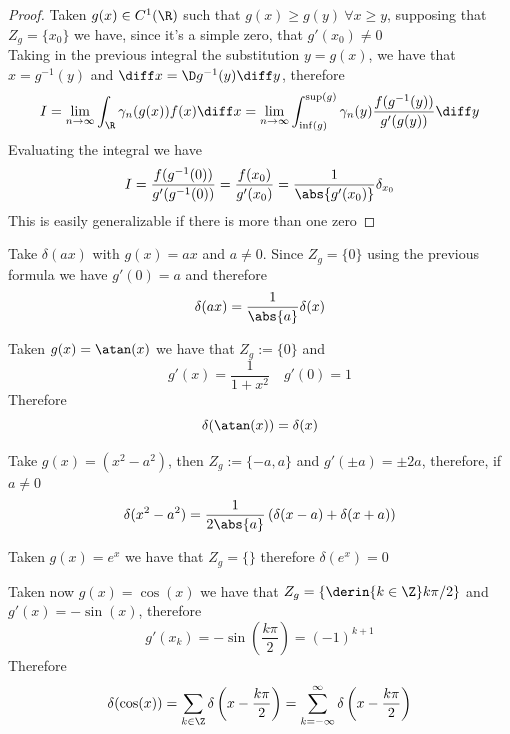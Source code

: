 \documentclass[../mmf.tex]{subfiles}
\begin{document}
\begin{proof}
	Taken $g(x)\in C^1(\R)$ such that $g(x)\ge g(y)\ \forall x\ge y$, supposing that $Z_g=\{x_0\}$ we have, since it's a simple zero, that $g'(x_0)\ne0$\\
	Taking in the previous integral the substitution $y=g(x)$, we have that $x=g^{-1}(y)$ and $\diff x=\D g^{-1}(y)\diff y$, therefore
	\begin{equation*}
		I=\lim_{n\to\infty}\int_{\R}^{}\gamma_n(g(x))f(x)\diff x=\lim_{n\to\infty}\int_{\inf(g)}^{\sup(g)}\gamma_n(y)\frac{f(g^{-1}(y))}{g'(g(y))}\diff y
	\end{equation*}
	Evaluating the integral we have
	\begin{equation*}
		I=\frac{f(g^{-1}(0))}{g'(g^{-1}(0))}=\frac{f(x_0)}{g'(x_0)}=\frac{1}{\abs{g'(x_0)}}\delta_{x_0}
	\end{equation*}
	This is easily generalizable if there is more than one zero
\end{proof}
\begin{eg}
	Take $\delta(ax)$ with $g(x)=ax$ and $a\ne0$. Since $Z_g=\{0\}$ using the previous formula we have $g'(0)=a$ and therefore
	\begin{equation*}
		\delta(ax)=\frac{1}{\abs{a}}\delta(x)
	\end{equation*}
\end{eg}
\begin{eg}
	Taken $g(x)=\atan(x)$ we have that $Z_g:=\{0\}$ and
	\begin{equation*}
		g'(x)=\frac{1}{1+x^2}\quad g'(0)=1
	\end{equation*}
	Therefore
	\begin{equation*}
		\delta(\atan(x))=\delta(x)
	\end{equation*}
\end{eg}
\begin{eg}
	Take $g(x)=(x^2-a^2)$, then $Z_g:=\{-a,a\}$ and $g'(\pm a)=\pm2a$, therefore, if $a\ne0$
	\begin{equation*}
		\delta(x^2-a^2)=\frac{1}{2\abs{a}}\left(\delta(x-a)+\delta(x+a)\right)
	\end{equation*}
\end{eg}
\begin{eg}
	Taken $g(x)=e^x$ we have that $Z_g=\{\}$ therefore $\delta(e^x)=0$
\end{eg}
\begin{eg}
	Taken now $g(x)=\cos(x)$ we have that $Z_g=\left\{ \derin{k\in\Z} k\pi/2 \right\}$ and $g'(x)=-\sin(x)$, therefore
	\begin{equation*}
		g'(x_k)=-\sin(\frac{k\pi}{2})=(-1)^{k+1}
	\end{equation*}
	Therefore
	\begin{equation*}
		\delta(\cos(x))=\sum_{k\in\Z}\delta\left(x-\frac{k\pi}{2}\right)=\sum_{k=-\infty}^{\infty}\delta\left( x-\frac{k\pi}{2} \right)
	\end{equation*}
\end{eg}
\end{document}
